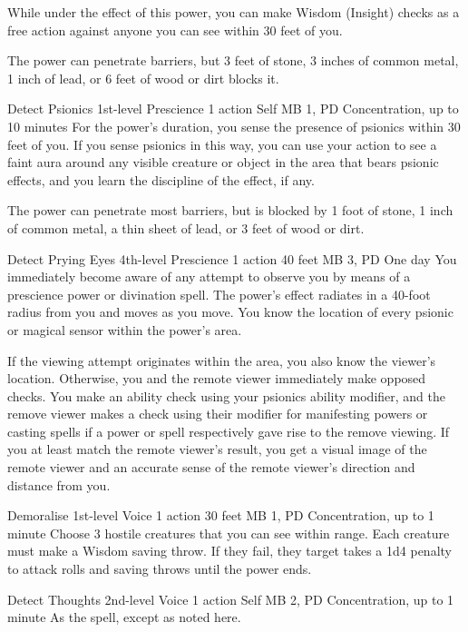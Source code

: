   While under the effect of this power,
  you can make Wisdom (Insight) checks as a free action
  against anyone you can see within 30 feet of you.
  
  The power can penetrate barriers, but 3 feet of stone,
  3 inches of common metal,
  1 inch of lead,
  or 6 feet of wood or dirt blocks it.

\DndPowerHeader%
  {Detect Psionics}
  {1st-level Prescience}
  {1 action}
  {Self}
  {MB 1, PD \lvlone}
  {Concentration, up to 10 minutes}
For the power's duration,
you sense the presence of psionics within 30 feet of you.
If you sense psionics in this way,
you can use your action to see a faint aura around
any visible creature or object in the area that bears psionic effects,
and you learn the discipline of the effect, if any.

The power can penetrate most barriers, but is blocked by
1 foot of stone,
1 inch of common metal,
a thin sheet of lead,
or 3 feet of wood or dirt.

\DndPowerHeader%
  {Detect Prying Eyes}
  {4th-level Prescience}
  {1 action}
  {40 feet}
  {MB 3, PD \lvlfour}
  {One day}
  You immediately become aware of any attempt to observe you
  by means of a prescience power or divination spell.
  The power's effect radiates in a 40-foot radius
  from you and moves as you move.
  You know the location of every psionic or magical sensor
  within the power's area.

  If the viewing attempt originates within the area,
  you also know the viewer's location.
  Otherwise, you and the remote viewer immediately make opposed checks.
  You make an ability check using your psionics ability modifier,
  and the remove viewer makes a check using their modifier
  for manifesting powers or casting spells if a power or spell
  respectively gave rise to the remove viewing.
  If you at least match the remote viewer's result,
  you get a visual image of the remote viewer
  and an accurate sense of the remote viewer's
  direction and distance from you.

\DndPowerHeader%
  {Demoralise}
  {1st-level Voice}
  {1 action}
  {30 feet}
  {MB 1, PD \lvlone}
  {Concentration, up to 1 minute}
Choose 3 hostile creatures that you can see within range.
Each creature must make a Wisdom saving throw.
If they fail, they target takes a 1d4 penalty to attack rolls and
saving throws until the power ends.

\DndPowerHeader%
  {Detect Thoughts}
  {2nd-level Voice}
  {1 action}
  {Self}
  {MB 2, PD \lvltwo}
  {Concentration, up to 1 minute}
As the  spell, except as noted here.

